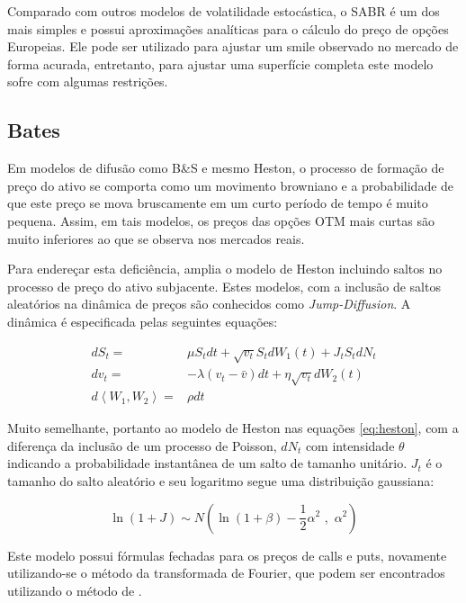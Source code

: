 \documentclass[]{book}
\theoremstyle{definition}
\theoremstyle{definition}
\theoremstyle{definition}
\theoremstyle{remark}
\begin{document}
Comparado com outros modelos de volatilidade estocástica, o SABR é um dos mais simples e possui aproximações analíticas para o cálculo do preço de opções Europeias. Ele pode ser utilizado para ajustar um smile observado no mercado de forma acurada, entretanto, para ajustar uma superfície completa este modelo sofre com algumas restrições.

\hypertarget{bates}{%
\subsection{Bates}\label{bates}}

Em modelos de difusão como B\&S e mesmo Heston, o processo de formação de preço do ativo se comporta como um movimento browniano e a probabilidade de que este preço se mova bruscamente em um curto período de tempo é muito pequena. Assim, em tais modelos, os preços das opções OTM mais curtas são muito inferiores ao que se observa nos mercados reais.

Para endereçar esta deficiência, \citet{Bates1996} amplia o modelo de Heston incluindo saltos no processo de preço do ativo subjacente. Estes modelos, com a inclusão de saltos aleatórios na dinâmica de preços são conhecidos como \emph{Jump-Diffusion}. A dinâmica é especificada pelas seguintes equações:

\begin{equation}
\begin{aligned}
dS_t=&\mu S_tdt+\sqrt{v_t}S_tdW_1(t)+J_t S_t dN_t\\
dv_t=&-\lambda(v_t-\bar v)dt+\eta\sqrt{v_t}dW_2(t)\\
d\left\langle W_1, W_2 \right\rangle =&\rho dt
\end{aligned}
\label{eq:bates}
\end{equation}

Muito semelhante, portanto ao modelo de Heston nas equações \eqref{eq:heston}, com a diferença da inclusão de um processo de Poisson, \(dN_t\) com intensidade \(\theta\) indicando a probabilidade instantânea de um salto de tamanho unitário. \(J_t\) é o tamanho do salto aleatório e seu logaritmo segue uma distribuição gaussiana:

\begin{equation}
\ln{(1+J)}\sim N\left(\ln(1+\beta)-\frac{1}{2}\alpha^2\,\, ,\,\,\alpha^2\right)
\label{eq:jt}
\end{equation}

Este modelo possui fórmulas fechadas para os preços de calls e puts, novamente utilizando-se o método da transformada de Fourier, que podem ser encontrados utilizando o método de \citet{Duffie2000}.
\end{document}
